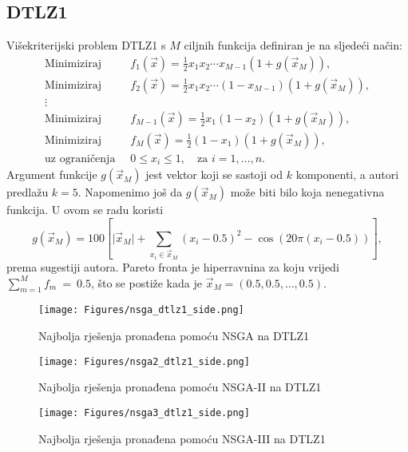 \documentclass[times, utf8, zavrsni, numeric]{fer}
\begin{document}
\subsection{DTLZ1}
Višekriterijski problem DTLZ1 s $M$ ciljnih funkcija definiran je na sljedeći način:
\begin{align*}
\mbox{Minimiziraj }\: &f_1(\vec{x}) = \frac{1}{2}x_1x_2\cdots x_{M - 1}(1 + g(\vec{x}_M)),\\
\mbox{Minimiziraj }\: &f_2(\vec{x}) = \frac{1}{2}x_1x_2\cdots (1-x_{M - 1})(1 + g(\vec{x}_M)),\\
\vdots &\\
\mbox{Minimiziraj }\: &f_{M - 1}(\vec{x}) = \frac{1}{2}x_1(1-x_2)(1 + g(\vec{x}_M)),\\
\mbox{Minimiziraj }\: &f_{M}(\vec{x}) = \frac{1}{2}(1-x_1)(1 + g(\vec{x}_M)),\\
\mbox{uz ograničenja }\: &0 \leq x_i \leq 1, \quad \text{za } i = 1,\dots, n.
\end{align*}
Argument funkcije $g(\vec{x}_M)$ jest vektor koji se sastoji od $k$ komponenti, a autori \citep{dtlz} predlažu $k = 5$. Napomenimo još da $g(\vec{x}_M)$ može biti bilo koja nenegativna funkcija. U ovom se radu koristi
\begin{equation}
\label{eq:cos_g}
g(\vec{x}_M) = 100\left[\vert\vec{x}_M\vert + \sum_{x_i \in \vec{x}_M}{(x_i - 0.5)^2 - \cos(20\pi(x_i - 0.5))}\right],
\end{equation}  
prema sugestiji autora. Pareto fronta je hiperravnina za koju vrijedi $\sum_{m = 1}^M{f_m}~ =~0.5$, što se postiže kada je $\vec{x}_M = (0.5, 0.5, \dots, 0.5)$. 

\begin{figure}[htb]
\centering
\texttt{[image: Figures/nsga\_dtlz1\_side.png]}
\caption{Najbolja rješenja pronađena pomoću NSGA na DTLZ1}
\label{fig:nsga_dtlz1}
\end{figure}

\begin{figure}[htb]
\centering
\texttt{[image: Figures/nsga2\_dtlz1\_side.png]}
\caption{Najbolja rješenja pronađena pomoću NSGA-II na DTLZ1}
\label{fig:nsgaii_dtlz1}
\end{figure}

\begin{figure}[htb]
\centering
\texttt{[image: Figures/nsga3\_dtlz1\_side.png]}
\caption{Najbolja rješenja pronađena pomoću NSGA-III na DTLZ1}
\label{fig:nsgaiii_dtlz1}
\end{figure}
\end{document}
